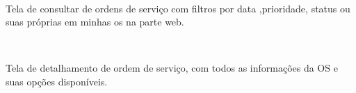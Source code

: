 \begin{figure}[htb]
	\centering
	\mbox{%
		\qquad
	}
	
\end{figure}
\newpage
Tela de consultar de ordens de serviço com filtros por data ,prioridade, status ou suas próprias em minhas os na parte web.

\begin{figure}[htb]
	\centering
	\mbox{%
		\qquad
	}
	
\end{figure}
\newpage
Tela de detalhamento de ordem de serviço, com todos as informações da OS e suas opções disponíveis.

